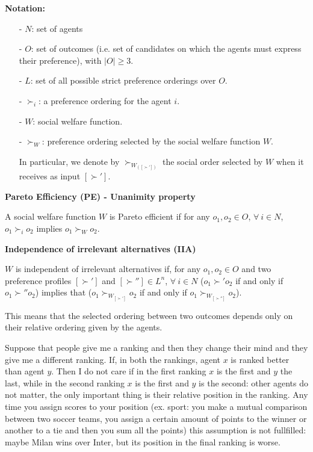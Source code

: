 %
%


\bigskip
\noindent \textbf{Notation:}
\begin{itemize}
	\item [-] $N$: set of agents
	\item [-] $O$: set of outcomes (i.e. set of candidates on which the agents 
	must express their preference), with $|O| \geq 3$.
	\item [-] $L$: set of all possible strict preference orderings over $O$.
	\item [-] $\succ_i$: a preference ordering for the agent $i$.
	\item [-] $W$: social welfare function.
	\item [-] $\succ_W$: preference ordering selected by the social welfare 
	function $W$.

	\noindent In particular, we denote by $\succ_{W_{([\succ'])}}$ the social 
	order selected by $W$ when it receives as input $[\succ']$.
\end{itemize}

\bigskip
\noindent \textbf{Pareto Efficiency (PE) - Unanimity property}

\noindent A social welfare function $W$ is Pareto efficient if for any $o_1, o_2 
\in O$, $\forall~i \in N$, $o_1 \succ_i o_2$ implies $o_1 \succ_W o_2$.

\bigskip
\noindent \textbf{Independence of irrelevant alternatives (IIA)}

\noindent $W$ is independent of irrelevant alternatives if, for any $o_1,o_2 
\in O$ and two preference profiles $[\succ']$ and $[\succ''] \in L^n$, 
$\forall~i \in N$ ($o_1 \succ' o_2$ if and only if $o_1 \succ'' o_2$) implies 
that ($o_1 \succ_{W_{[\succ']}} o_2$ if and only if $o_1 \succ_{W_{[\succ'']}} 
o_2$).

\bigskip
\noindent This means that the selected ordering between two outcomes depends 
only on their relative ordering given by the agents.

\noindent Suppose that 
people give me a ranking and then they change their mind and they give me a 
different ranking. If, in both the rankings, agent $x$ is ranked better than 
agent $y$. Then I do not care if in the first ranking $x$ is the first and $y$ 
the last, while in the second ranking $x$ is the first and $y$ is the second: 
other agents do not matter, the only important thing is their relative position 
in the ranking. Any time you assign scores to your position (ex. sport: you make 
a mutual comparison between two soccer teams, you assign a certain amount 
of points to the winner or another to a tie and then you sum all the points) 
this assumption is not fullfilled: maybe Milan wins over Inter, but its position 
in the final ranking is worse.


